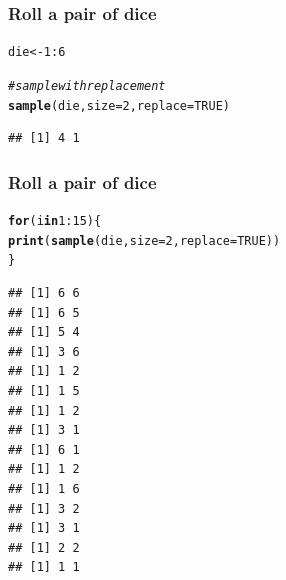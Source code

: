 \documentclass[12pt]{beamer}\usepackage[]{graphicx}\usepackage[]{color}
\makeatletter
\newcommand{\hlnum}[1]{\textcolor[rgb]{0.686,0.059,0.569}{#1}}%
\newcommand{\hlcom}[1]{\textcolor[rgb]{0.678,0.584,0.686}{\textit{#1}}}%
\newcommand{\hlopt}[1]{\textcolor[rgb]{0,0,0}{#1}}%
\newcommand{\hlstd}[1]{\textcolor[rgb]{0.345,0.345,0.345}{#1}}%
\newcommand{\hlkwa}[1]{\textcolor[rgb]{0.161,0.373,0.58}{\textbf{#1}}}%
\newcommand{\hlkwb}[1]{\textcolor[rgb]{0.69,0.353,0.396}{#1}}%
\newcommand{\hlkwc}[1]{\textcolor[rgb]{0.333,0.667,0.333}{#1}}%
\newcommand{\hlkwd}[1]{\textcolor[rgb]{0.737,0.353,0.396}{\textbf{#1}}}%
\newenvironment{kframe}{%
 \def\at@end@of@kframe{}%
 \ifinner\ifhmode%
  \def\at@end@of@kframe{\end{minipage}}%
  \begin{minipage}{\columnwidth}%
 \fi\fi%
 \def\FrameCommand##1{\hskip\@totalleftmargin \hskip-\fboxsep
 \colorbox{shadecolor}{##1}\hskip-\fboxsep
     \hskip-\linewidth \hskip-\@totalleftmargin \hskip\columnwidth}%
 \MakeFramed {\advance\hsize-\width
   \@totalleftmargin\z@ \linewidth\hsize
   \@setminipage}}%
 {\par\unskip\endMakeFramed%
 \at@end@of@kframe}
\newenvironment{knitrout}{}{} %
\makeatother
\begin{document}
\begin{frame}[fragile]
\frametitle{Roll a pair of dice}

\begin{knitrout}\footnotesize
{}\color{fgcolor}\begin{kframe}
\begin{alltt}
\hlstd{die} \hlkwb{<-} \hlnum{1}\hlopt{:}\hlnum{6}

\hlcom{# sample with replacement}
\hlkwd{sample}\hlstd{(die,} \hlkwc{size} \hlstd{=} \hlnum{2}\hlstd{,} \hlkwc{replace} \hlstd{=} \hlnum{TRUE}\hlstd{)}
\end{alltt}
\begin{verbatim}
## [1] 4 1
\end{verbatim}
\end{kframe}
\end{knitrout}

\end{frame}


\begin{frame}[fragile]
\frametitle{Roll a pair of dice}

\begin{knitrout}\scriptsize
{}\color{fgcolor}\begin{kframe}
\begin{alltt}
\hlkwa{for} \hlstd{(i} \hlkwa{in} \hlnum{1}\hlopt{:}\hlnum{15}\hlstd{) \{}
  \hlkwd{print}\hlstd{(}\hlkwd{sample}\hlstd{(die,} \hlkwc{size} \hlstd{=} \hlnum{2}\hlstd{,} \hlkwc{replace} \hlstd{=} \hlnum{TRUE}\hlstd{))}
\hlstd{\}}
\end{alltt}
\begin{verbatim}
## [1] 6 6
## [1] 6 5
## [1] 5 4
## [1] 3 6
## [1] 1 2
## [1] 1 5
## [1] 1 2
## [1] 3 1
## [1] 6 1
## [1] 1 2
## [1] 1 6
## [1] 3 2
## [1] 3 1
## [1] 2 2
## [1] 1 1
\end{verbatim}
\end{kframe}
\end{knitrout}
\end{frame}

\end{document}
